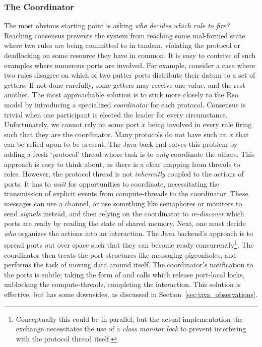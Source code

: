 \subsubsection{The Coordinator}
The most obvious starting point is asking \textit{who decides which rule to fire?} Reaching consensus prevents the system from reaching some mal-formed state where two rules are being committed to in tandem, violating the protocol or deadlocking on some resource they have in common. It is easy to contrive of such examples where numerous ports are involved. For example, consider a case where two rules disagree on which of two putter ports distribute their datum to a set of getters. If not done carefully, some getters may receive one value, and the rest another. The most approachable solution is to stick more closely to the Reo model by introducing a specialized \textit{coordinator} for each protocol. Consensus is trivial when one participant is elected the leader for every circumstance. Unfortunately, we cannot rely on some port $x$ being involved in every rule firing such that they are the coordinator. Many protocols do not have such an $x$ that can be relied upon to be present. The Java back-end solves this problem by adding a fresh `protocol' thread whose task is to \textit{only} coordinate the others. This approach is easy to think about, as there is a clear mapping from threads to roles. However, the protocol thread is not \textit{inherently} coupled to the actions of ports. It has to \textit{wait} for opportunities to coordinate, necessitating the transmission of explicit events from compute-threads to the coordinator. These messages can use a channel, or use something like semaphores or monitors to send \textit{signals} instead, and then relying on the coordinator to \textit{re-discover} which ports are ready by reading the state of shared memory. Next, one must decide \textit{who} organizes the actions into an interaction. The Java backend's approach is to spread ports out over space such that they can become ready concurrently\footnote{Conceptually this could be in parallel, but the actual implementation the exchange necessitates the use of a \textit{class monitor lock} to prevent interfering with the protocol thread itself.}. The coordinator then treats the port structures like messaging pigeonholes, and performs the task of moving data around itself. The coordinator's notification to the ports is subtle; taking the form of  and  calls which release port-local locks, unblocking the compute-threads, completing the interaction. This solution is effective, but has some downsides, as discussed in Section~\ref{sec:java_observations}. 

